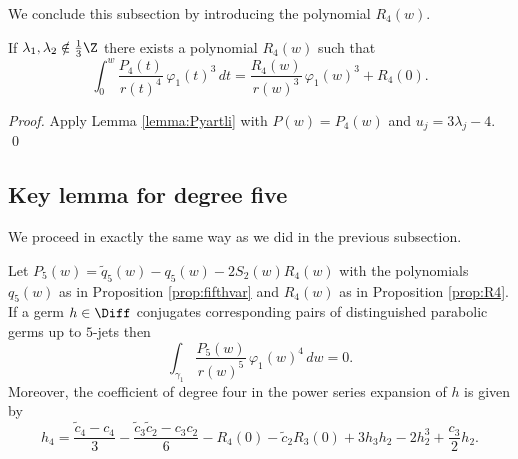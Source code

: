 We conclude this subsection by introducing the polynomial $R_4(w)$.
\begin{proposition}\label{prop:R4}
If $\lambda_1,\lambda_2\notin\frac{1}{3}\Z$ there exists a polynomial $R_4(w)$ such that 
\[ \int_0^w\frac{P_4(t)}{r(t)^4}\,\varphi_1(t)^3\,dt=\frac{R_4(w)}{r(w)^3}\,\varphi_1(w)^3+R_4(0). \]
\end{proposition}

\begin{proof}
Apply Lemma \ref{lemma:Pyartli} with $P(w)=P_4(w)$ and $u_j=3\lambda_j-4$. 
\qed\end{proof}





\subsection{Key lemma for degree five}


We proceed in exactly the same way as we did in the previous subsection.

\begin{proposition}\label{prop:key5}
Let $P_5(w)=\tilde{q}_5(w)-q_5(w)-2S_2(w)R_4(w)$ with the polynomials $q_5(w)$ as in Proposition \textnormal{\ref{prop:fifthvar}} and $R_4(w)$ as in Proposition \textnormal{\ref{prop:R4}}. If a germ $h\in\Diff$ conjugates corresponding pairs of distinguished parabolic germs up to $5$-jets then
\[ \int_{\gamma_1}\frac{P_5(w)}{r(w)^5}\,\varphi_1(w)^4\,dw=0. \]
Moreover, the coefficient of degree four in the power series expansion of $h$ is given by
\begin{equation}\label{eq:h4}
 h_4=\frac{\tilde{c}_4-c_4}{3}-\frac{\tilde{c}_3\tilde{c}_2-c_3c_2}{6}-R_4(0)-\tilde{c}_2R_3(0)+3h_3h_2-2h_2^3+\frac{c_3}{2}h_2. 
\end{equation}
\end{proposition}


